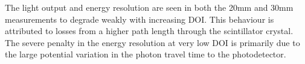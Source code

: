 The light output and energy resolution are seen in both the 20mm and 30mm measurements to degrade weakly with increasing DOI. This behaviour is attributed to losses from a higher path length through the scintillator crystal. The severe penalty in the energy resolution at very low DOI is primarily due to the large potential variation in the photon travel time to the photodetector.
